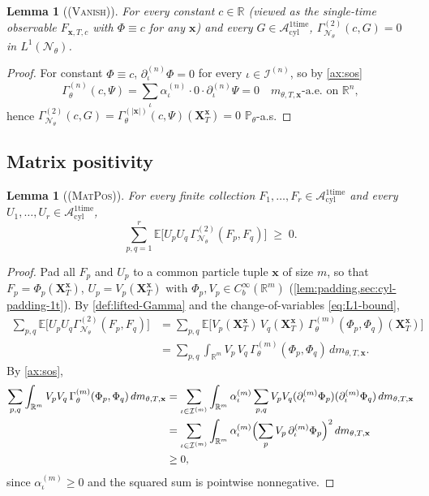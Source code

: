 \documentclass[11pt,reqno]{amsart}
\theoremstyle{plain}
\newtheorem{lemma}[theorem]{Lemma}
\theoremstyle{definition}
\theoremstyle{remark}
\newcommand{\R}{\mathbb R}
\newcommand{\E}{\mathbb E}
\newcommand{\Prob}{\mathbb P}
\newcommand{\cA}{\mathcal A}
\newcommand{\cN}{\mathcal N}
\newcommand{\cI}{\mathcal I}
\newcommand{\Aone}{\cA_{\mathrm{cyl}}^{\mathrm{1time}}}
\newcommand{\GamN}{\Gamma^{(2)}_{\cN_{\theta}}}
\newcommand{\GamM}[1]{\Gamma^{(#1)}_{\theta}}
\newcommand{\Pth}{\Prob_{\theta}}
\begin{document}
\begin{lemma}[\normalfont\textsc{(Vanish)}]\label{lem:vanish-cyl}
For every constant $c\in\R$ (viewed as the single-time observable
$F_{\mathbf x,T,c}$ with $\Phi\equiv c$ for any $\mathbf x$) and
every $G\in\Aone$, $\GamN(c,G)=0$ in $L^{1}(\cN_{\theta})$.
\end{lemma}

\begin{proof}
For constant $\Phi\equiv c$, $\partial^{(n)}_{\iota}\Phi=0$ for
every $\iota\in\cI^{(n)}$, so by \cref{ax:sos}
\[
  \GamM{n}(c,\Psi)
  =\sum_{\iota}\alpha^{(n)}_{\iota}\cdot 0\cdot\partial^{(n)}_{\iota}\Psi
  =0\quad\text{$m_{\theta,T,\mathbf x}$-a.e.\ on }\R^{n},
\]
hence
$\GamN(c,G)=\GamM{|\mathbf x|}(c,\Psi)(\mathbf X_{T}^{\mathbf x})=0$
$\Pth$-a.s.
\end{proof}

\subsection{Matrix positivity}\label{sec:axioms-matpos}

\begin{lemma}[\normalfont\textsc{(MatPos)}]\label{lem:matpos-cyl}
For every finite collection $F_{1},\ldots,F_{r}\in\Aone$ and every
$U_{1},\ldots,U_{r}\in\Aone$,
\begin{equation}\label{eq:axmatpos-cyl}
  \sum_{p,q=1}^{r}\E\bigl[U_{p}U_{q}\,\GamN(F_{p},F_{q})\bigr]\;\ge\;0.
\end{equation}
\end{lemma}

\begin{proof}
Pad all $F_{p}$ and $U_{p}$ to a common particle tuple $\mathbf x$
of size $m$, so that
$F_{p}=\Phi_{p}(\mathbf X_{T}^{\mathbf x})$,
$U_{p}=V_{p}(\mathbf X_{T}^{\mathbf x})$ with
$\Phi_{p},V_{p}\in C_{b}^{\infty}(\R^{m})$
(\cref{lem:padding,sec:cyl-padding-1t}). By
\cref{def:lifted-Gamma} and the change-of-variables
\eqref{eq:L1-bound},
\begin{align*}
  \sum_{p,q}\E\bigl[U_{p}U_{q}\GamN(F_{p},F_{q})\bigr]
  &=\sum_{p,q}\E\bigl[V_{p}(\mathbf X_{T}^{\mathbf x})\,V_{q}(\mathbf X_{T}^{\mathbf x})\,\GamM{m}(\Phi_{p},\Phi_{q})(\mathbf X_{T}^{\mathbf x})\bigr]\\
  &=\sum_{p,q}\int_{\R^{m}}V_{p}\,V_{q}\,\GamM{m}(\Phi_{p},\Phi_{q})\,dm_{\theta,T,\mathbf x}.
\end{align*}
By \cref{ax:sos},
\begin{align*}
  \sum_{p,q}\int_{\R^{m}}V_{p}V_{q}\,\GamM{m}(\Phi_{p},\Phi_{q})\,dm_{\theta,T,\mathbf x}
  &=\sum_{\iota\in\cI^{(m)}}\int_{\R^{m}}\alpha^{(m)}_{\iota}
     \sum_{p,q}V_{p}V_{q}(\partial^{(m)}_{\iota}\Phi_{p})(\partial^{(m)}_{\iota}\Phi_{q})\,dm_{\theta,T,\mathbf x}\\
  &=\sum_{\iota\in\cI^{(m)}}\int_{\R^{m}}\alpha^{(m)}_{\iota}
     \Bigl(\sum_{p}V_{p}\,\partial^{(m)}_{\iota}\Phi_{p}\Bigr)^{2}\,dm_{\theta,T,\mathbf x}\\
  &\ge 0,
\end{align*}
since $\alpha^{(m)}_{\iota}\ge 0$ and the squared sum is pointwise
nonnegative.
\end{proof}
\end{document}
